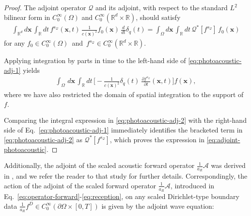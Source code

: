 \documentclass[11pt,reqno]{amsart}
\theoremstyle{remark}
\newcommand{\bx}{\boldsymbol{x}}
\begin{document}
\begin{proof}
The adjoint operator \( \mathcal{Q}\) and its adjoint, with respect to the standard 
\(L^2\) bilinear form in  \(C_0^\infty(\Omega)\) and \(C_0^\infty(\mathbb{R}^d \times \mathbb{R})\), should satisfy
\begin{align} \label{eq:photoacoustic-adj-1}
        \int_{\mathbb{R}^d} d\bx \, \int_{\mathbb{R}} dt \,
        f^{s_{\mathcal{Q}}}(\bx,t)  \,
        \frac{1}{c(\bx)^2} f_0(\bx)  \,  \frac{d}{dt}  \delta_q(t)
        = \int_{\Omega} d\bx \, \int_{\mathbb{R}} dt \, \mathcal{Q}^*[f^{s_{\mathcal{Q}}}]  \, f_0(\bx)
\end{align}
for any  \( f_0 \in C_0^\infty(\Omega)\)~and~\(f^{s_{\mathcal{Q}}} \in C_0^\infty(\mathbb{R}^d \times \mathbb{R})\).

Applying integration by parts in time to the left-hand side of 
\eqref{eq:photoacoustic-adj-1} yields
\begin{align} \label{eq:photoacoustic-adj-2}
    \int_{\Omega} \, d\bx \,   \int_{\mathbb{R}}   dt  \,  \Big[ - \frac{1}{ c(\bx)^2} 
    \delta_q(t) \
    \frac{\partial f^{s_{\mathcal{Q}}} }{\partial t} (\bx,t)  \Big]
    f(\bx),
\end{align}
where we have also restricted the domain of spatial integration to the support of \(f\).

Comparing the integral expression in \eqref{eq:photoacoustic-adj-2} with the right-hand side of Eq.~\eqref{eq:photoacoustic-adj-1} immediately identifies the bracketed term in \eqref{eq:photoacoustic-adj-2} as \(\mathcal{Q}^*[f^{s_{\mathcal{Q}}}]\), which proves the expression in \eqref{eq:adjoint-photoacoustic}.
\end{proof}

Additionally, the adjoint of the scaled acoustic forward operator \( \frac{1}{a_R} \mathcal{A} \) was derived in \cite{Javaherian2022}, and we refer the reader to that study for further details. Correspondingly, the action of the adjoint of the scaled forward operator \( \frac{1}{a_R} \mathcal{A} \), introduced in Eq.~\eqref{eq:operator-forward}-\eqref{eq:reception}, on any scaled Dirichlet-type boundary data \(\frac{1}{a_R} f^D \in C_0^{\infty}(\partial \Omega \times [0,T])\) is given by the adjoint wave equation:
\end{document}
